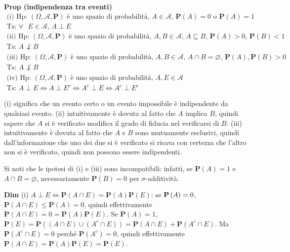 \documentclass{article}
\begin{document}
\textbf{Prop (indipendenza tra eventi)}%
\begin{gather*}
\text{(i) Hp}\text{: }\left( \Omega ,\mathcal{A},\mathbf{P}\right) \text{ 
\`{e} uno spazio di probabilit\`{a}, }A\in \mathcal{A}\text{, }\mathbf{P}%
\left( A\right) =0\text{ o }\mathbf{P}\left( A\right) =1 \\
\text{Ts}\text{: }\forall \text{ }E\in \mathcal{A}\text{, }A\perp E \\
\text{(ii) Hp}\text{: }\left( \Omega ,\mathcal{A},\mathbf{P}\right) \text{ 
\`{e} uno spazio di probabilit\`{a}, }A,B\in \mathcal{A}\text{, }A\subseteq B%
\text{, }\mathbf{P}\left( A\right) >0\text{, }\mathbf{P}\left( B\right) <1 \\
\text{Ts}\text{: }A\not\perp B \\
\text{(iii) Hp}\text{: }\left( \Omega ,\mathcal{A},\mathbf{P}\right) \text{ 
\`{e} uno spazio di probabilit\`{a}, }A,B\in \mathcal{A}\text{, }A\cap
B=\varnothing \text{, }\mathbf{P}\left( A\right) ,\mathbf{P}\left( B\right)
>0 \\
\text{Ts}\text{: }A\not\perp B \\
\text{(iv) Hp}\text{: }\left( \Omega ,\mathcal{A},\mathbf{P}\right) \text{ 
\`{e} uno spazio di probabilit\`{a}, }A,E\in \mathcal{A} \\
\text{Ts}\text{: }A\perp E\Longleftrightarrow A\perp
E^{c}\Longleftrightarrow A^{c}\perp E\Longleftrightarrow A^{c}\perp E^{c}
\end{gather*}

(i) significa che un evento certo o un evento impossibile \`{e} indipendente
da qualsiasi evento. (ii) intuitivamente \`{e} dovuta al fatto che $A$
implica $B$, quindi sapere che $A$ si \`{e} verificato modifica il grado di
fiducia nel verificarsi di $B$. (iii) intuitivamente \`{e} dovuta al fatto
che $A$ e $B$ sono mutuamente esclusivi, quindi dall'informazione che uno
dei due si \`{e} verificato si ricava con certezza che l'altro non si \`{e}
verificato, quindi non possono essere indipendenti.

Si noti che le ipotesi di (i) e (iii) sono incompatibili: infatti, se $%
\mathbf{P}\left( A\right) =1$ e $A\cap B=\varnothing $, necessariamente $%
\mathbf{P}\left( B\right) =0$ per $\sigma $-additivit\`{a}.

\textbf{Dim} (i) $A\perp E\Longleftrightarrow \mathbf{P}\left( A\cap
E\right) =\mathbf{P}\left( A\right) \mathbf{P}\left( E\right) $: se $\mathbf{%
P}\left( A\right) =0$, $\mathbf{P}\left( A\cap E\right) \leq \mathbf{P}%
\left( A\right) =0$, quindi effettivamente $\mathbf{P}\left( A\cap E\right)
=0=\mathbf{P}\left( A\right) \mathbf{P}\left( E\right) $. Se $\mathbf{P}%
\left( A\right) =1$, $\mathbf{P}\left( E\right) =\mathbf{P}\left( \left(
A\cap E\right) \cup \left( A^{c}\cap E\right) \right) =\mathbf{P}\left(
A\cap E\right) +\mathbf{P}\left( A^{c}\cap E\right) $. Ma $\mathbf{P}\left(
A^{c}\cap E\right) =0$ perch\'{e} $\mathbf{P}\left( A^{c}\right) =0$, quindi
effettivamente $\mathbf{P}\left( A\cap E\right) =\mathbf{P}\left( A\right) 
\mathbf{P}\left( E\right) =\mathbf{P}\left( E\right) $.
\end{document}
